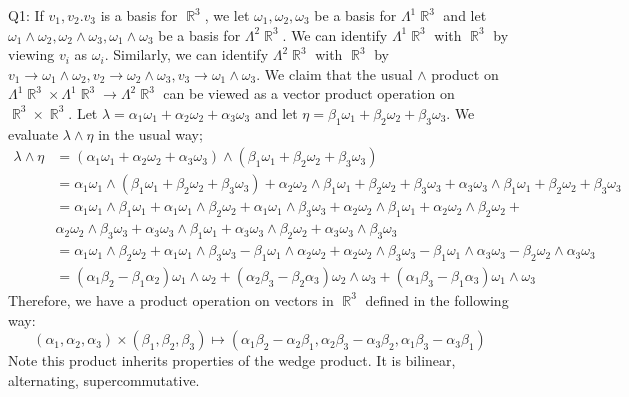 \documentclass[letterpaper]{article}
\DeclareMathOperator{\R}{\mathbb{R}}
\begin{document}
\noindent Q1: If $v_1,v_2.v_3$ is a basis for $\R^3$, we let $\omega_1,\omega_2,\omega_3$ be a basis for $\Lambda^1 \R^3$ and let $\omega_1 \wedge \omega_2, \omega_2 \wedge \omega_3, \omega_1 \wedge \omega_3$ be a basis for $\Lambda^2 \R^3$.
We can identify $\Lambda^1 \R^3$ with $\R^3$ by viewing $v_i$ as $\omega_i$. Similarly, we can identify $\Lambda^2 \R^3$ with $\R^3$ by $v_1 \to \omega_1 \wedge \omega_2, v_2 \to \omega_2\wedge \omega_3, v_3 \to \omega_1 \wedge \omega_3$. We claim that the usual $\wedge$ product on $\Lambda^1\R^3 \times \Lambda^1\R^3 \to \Lambda^2 \R^3$ can be viewed as a vector product operation on $\R^3\times \R^3$. 
Let $\lambda = \alpha_1 \omega_1 + \alpha_2 \omega_2 + \alpha_3 \omega_3$ and let $\eta  = \beta_1 \omega_1 + \beta_2 \omega_2 + \beta_3 \omega_3$. We evaluate $\lambda \wedge \eta$ in the usual way; 
\begin{align*}
    \lambda \wedge \eta & = (\alpha_1 \omega_1 + \alpha_2 \omega_2 + \alpha_3 \omega_3)\wedge (\beta_1 \omega_1 + \beta_2 \omega_2 + \beta_3 \omega_3)
    \\ & = \alpha_1 \omega_1 \wedge (\beta_1 \omega_1 + \beta_2 \omega_2 + \beta_3 \omega_3) + \alpha_2 \omega_2 \wedge \beta_1 \omega_1 + \beta_2 \omega_2 + \beta_3 \omega_3 + \alpha_3 \omega_3 \wedge \beta_1 \omega_1 + \beta_2 \omega_2 + \beta_3 \omega_3
    \\ & = \alpha_1 \omega_1 \wedge \beta_1 \omega_1 + \alpha_1 \omega_1 \wedge \beta_2 \omega_2 + \alpha_1 \omega_1 \wedge \beta_3 \omega_3 + \alpha_2 \omega_2 \wedge \beta_1 \omega_1 + \alpha_2 \omega_2 \wedge \beta_2 \omega_2 + \\ &  \alpha_2 \omega_2 \wedge \beta_3 \omega_3 + \alpha_3 \omega_3 \wedge \beta_1 \omega_1 + \alpha_3 \omega_3 \wedge \beta_2 \omega_2 + \alpha_3 \omega_3 \wedge \beta_3 \omega_3
    \\ & = \alpha_1 \omega_1 \wedge \beta_2 \omega_2 + \alpha_1 \omega_1 \wedge \beta_3 \omega_3 -\beta_1 \omega_1 \wedge \alpha_2 \omega_2 + \alpha_2 \omega_2 \wedge \beta_3 \omega_3 - \beta_1 \omega_1 \wedge \alpha_3 \omega_3 - \beta_2 \omega_2 \wedge \alpha_3 \omega_3 \tag{by supercommutativity}
    \\ & = (\alpha_1\beta_2-\beta_1\alpha_2)\omega_1\wedge \omega_2 + (\alpha_2\beta_3 - \beta_2 \alpha_3)\omega_2 \wedge \omega_3 + (\alpha_1\beta_3 - \beta_1 \alpha_3) \omega_1 \wedge \omega_3 \tag{by linearity of $\wedge$}
\end{align*} 
Therefore, we have a product operation on vectors in $\R^3$ defined in the following way: $$(\alpha_1,\alpha_2,\alpha_3)\times (\beta_1,\beta_2,\beta_3) \mapsto (\alpha_1\beta_2-\alpha_2\beta_1, \alpha_2\beta_3-\alpha_3\beta_2,\alpha_1\beta_3-\alpha_3\beta_1) $$
Note this product inherits properties of the wedge product. It is bilinear, alternating, supercommutative. 
\end{document}
